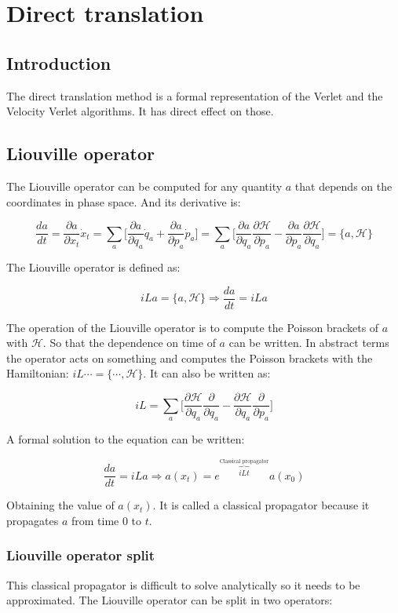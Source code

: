 \chapter{Direct translation}

\section{Introduction}
The direct translation method is a formal representation of the Verlet and the Velocity Verlet algorithms.
It has direct effect on those.

\section{Liouville operator}
The Liouville operator can be computed for any quantity $a$ that depends on the coordinates in phase space.
And its derivative is:

$$\frac{da}{dt} = \frac{\partial a}{\partial x_t}\dot{x}_t = \sum\limits_a\biggl[\frac{\partial a}{\partial q_a}\dot{q}_a + \frac{\partial a}{\partial p_a}\dot{p}_a\biggr] = \sum\limits_a\biggl[\frac{\partial a}{\partial q_a}\frac{\partial\mathcal{H}}{\partial p_a} - \frac{\partial a}{\partial p_a}\frac{\partial\mathcal{H}}{\partial q_a}\biggr] = \{a, \mathcal{H}\}$$

The Liouville operator is defined as:

$$iLa = \{a, \mathcal{H}\}\Rightarrow\frac{da}{dt} = iLa$$

The operation of the Liouville operator is to compute the Poisson brackets of $a$ with $\mathcal{H}$.
So that the dependence on time of $a$ can be written.
In abstract terms the operator acts on something and computes the Poisson brackets with the Hamiltonian: $iL\cdots = \{\cdots, \mathcal{H}\}$.
It can also be written as:

$$iL = \sum\limits_a\biggl[\frac{\partial\mathcal{H}}{\partial q_a}\frac{\partial}{\partial q_a} - \frac{\partial\mathcal{H}}{\partial q_a}\frac{\partial}{\partial p_a}\biggr]$$

A formal solution to the equation can be written:

$$\frac{da}{dt} = iLa\Rightarrow a(x_t) = e^{\overbrace{iLt}^{\text{Classical propagator}}}a(x_0)$$

Obtaining the value of $a(x_t)$.
It is called a classical propagator because it propagates $a$ from time $0$ to $t$.

	\subsection{Liouville operator split}
	This classical propagator is difficult to solve analytically so it needs to be approximated.
	The Liouville operator can be split in two operators:

